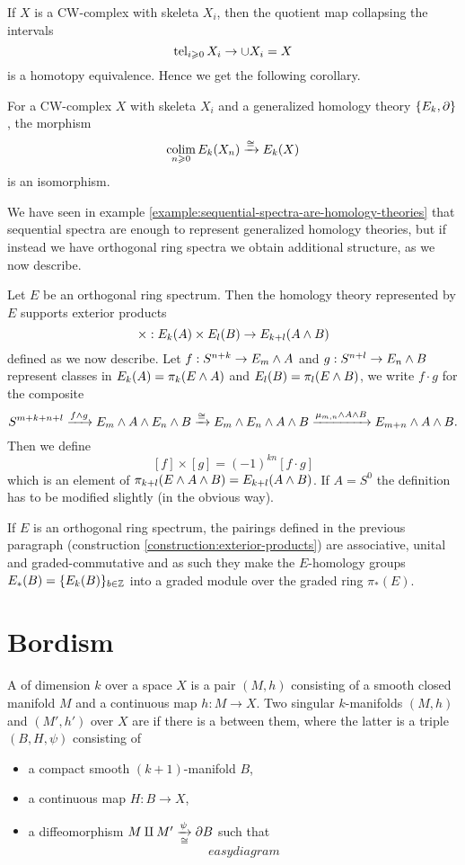 If $X$ is a CW-complex with skeleta $X_i$, then the quotient map collapsing the intervals
\[\operatorname{tel}_{i\geqslant0} X_i\to \cup X_i=X\]
is a homotopy equivalence. Hence we get the following corollary.

\begin{corollary}
For a CW-complex $X$ with skeleta $X_i$ and a generalized homology theory $\{E_k,\partial\}$, the morphism
\[\operatorname*{colim}_{n\geqslant0}E_k(X_n)\xrightarrow{\cong}E_k(X)\]
is an isomorphism.
\end{corollary}

We have seen in example \ref{example:sequential-spectra-are-homology-theories} that sequential spectra are enough to represent generalized homology theories, but if instead we have orthogonal ring spectra we obtain additional structure, as we now describe.

\begin{construction!}\label{construction:exterior-products}
Let $E$ be an orthogonal ring spectrum. Then the homology theory represented by $E$ supports exterior products
\[\times:E_k(A)\times E_l(B)\to E_{k+l}(A\wedge B)\]
defined as we now describe. Let $f:S^{n+k}\to E_m\wedge A$ and $g:S^{n+l}\to E_n\wedge B$ represent classes in $E_k(A)=\pi_k(E\wedge A)$ and $E_l(B)=\pi_l(E\wedge B)$, we write $f\cdot g$ for the composite
\[S^{m+k+n+l}\xrightarrow{f\wedge g}E_m\wedge A\wedge E_n\wedge B\xrightarrow{\cong}E_m\wedge E_n\wedge A\wedge B\xrightarrow{\mu_{m,n}\wedge A\wedge B}E_{m+n}\wedge A\wedge B.\]
Then we define
\[[f]\times[g]=(-1)^{kn}[f\cdot g]\]
which is an element of $\pi_{k+l}(E\wedge A\wedge B)=E_{k+l}(A\wedge B)$. If $A=S^0$ the definition has to be modified slightly (in the obvious way).
\end{construction!}

\begin{proposition}
If $E$ is an orthogonal ring spectrum, the pairings defined in the previous paragraph (construction \ref{construction:exterior-products}) are associative, unital and graded-commutative and as such they make the $E$-homology groups $E_*(B)=\{E_k(B)\}_{b\in{\mathbb Z}}$ into a graded module over the graded ring $\pi_*(E)$.
\end{proposition}

\section{Bordism}

\begin{definition}
A  of dimension $k$ over a space $X$ is a pair $(M,h)$ consisting of a smooth closed manifold $M$ and a continuous map $h:M\to X$. Two singular $k$-manifolds $(M,h)$ and $(M',h')$ over $X$ are  if there is a  between them, where the latter is a triple $(B,H,\psi)$ consisting of
\begin{itemize}
    \item a compact smooth $(k+1)$-manifold $B$,
    \item a continuous map $H:B\to X$,
    \item a diffeomorphism $M\amalg M'\underset{\cong}{\xrightarrow{\psi}}\partial B$ such that
    \[
    easydiagram
    \]
\end{itemize}
\end{definition}

